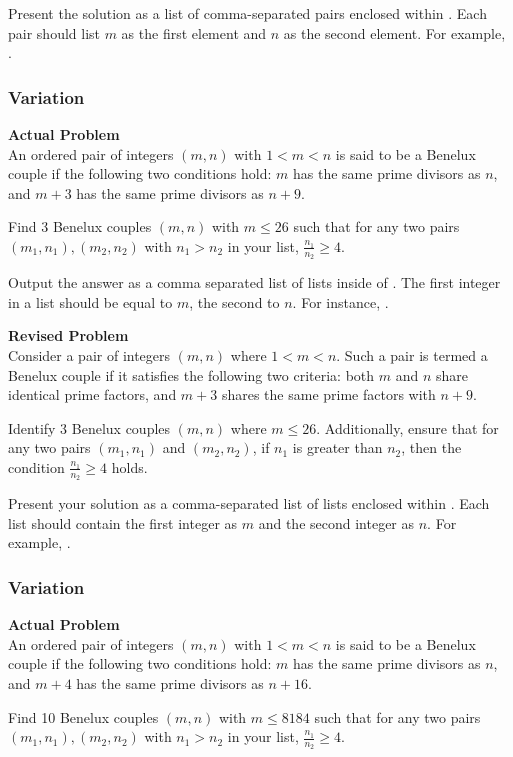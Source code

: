 Present the solution as a list of comma-separated pairs enclosed within . Each pair should list $m$ as the first element and $n$ as the second element. For example, .

\subsubsection{Variation}
\textbf{Actual Problem}\\
An ordered pair of integers $(m, n)$ with $1 < m < n$ is said to be a Benelux couple if the following two conditions hold: $m$ has the same prime divisors as $n$, and $m + 3$ has the same prime divisors as $n + 9$.

Find 3 Benelux couples $(m, n)$ with $m \leqslant 26$ such that for any two pairs $(m_1, n_1), (m_2, n_2)$ with $n_1 > n_2$ in your list, $\frac{n_1}{n_2} \geqslant 4$.

Output the answer as a comma separated list of lists inside of . The first integer in a list should be equal to $m$, the second to $n$. For instance, .

\textbf{Revised Problem}\\
Consider a pair of integers $(m, n)$ where $1 < m < n$. Such a pair is termed a Benelux couple if it satisfies the following two criteria: both $m$ and $n$ share identical prime factors, and $m + 3$ shares the same prime factors with $n + 9$.

Identify 3 Benelux couples $(m, n)$ where $m \leq 26$. Additionally, ensure that for any two pairs $(m_1, n_1)$ and $(m_2, n_2)$, if $n_1$ is greater than $n_2$, then the condition $\frac{n_1}{n_2} \geq 4$ holds.

Present your solution as a comma-separated list of lists enclosed within . Each list should contain the first integer as $m$ and the second integer as $n$. For example, .

\subsubsection{Variation}
\textbf{Actual Problem}\\
An ordered pair of integers $(m, n)$ with $1 < m < n$ is said to be a Benelux couple if the following two conditions hold: $m$ has the same prime divisors as $n$, and $m + 4$ has the same prime divisors as $n + 16$.

Find 10 Benelux couples $(m, n)$ with $m \leqslant 8184$ such that for any two pairs $(m_1, n_1), (m_2, n_2)$ with $n_1 > n_2$ in your list, $\frac{n_1}{n_2} \geqslant 4$.

